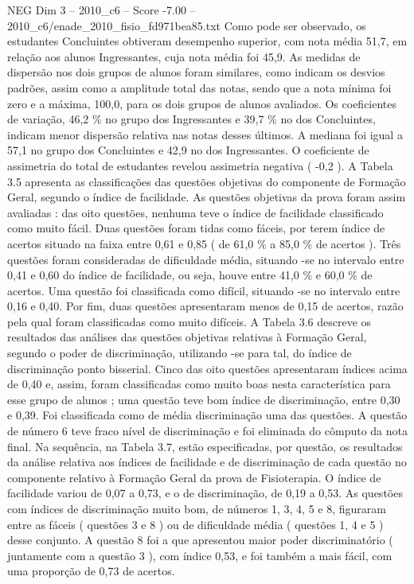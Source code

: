 \begin{textsample}{NEG Dim 3 – 2010\_c6 – Score -7.00 – 2010\_c6/enade\_2010\_fisio\_fd971bea85.txt}
Como pode ser observado, os estudantes Concluintes obtiveram desempenho superior, com nota média 51,7, em relação aos alunos Ingressantes, cuja nota média foi 45,9.
As medidas de dispersão nos dois grupos de alunos foram similares, como indicam os desvios padrões, assim como a amplitude total das notas, sendo que a nota mínima foi zero e a máxima, 100,0, para os dois grupos de alunos avaliados.
Os coeficientes de variação, 46,2 \% no grupo dos Ingressantes e 39,7 \% no dos Concluintes, indicam menor dispersão relativa nas notas desses últimos.
A mediana foi igual a 57,1 no grupo dos Concluintes e 42,9 no dos Ingressantes.
O coeficiente de assimetria do total de estudantes revelou assimetria negativa ( -0,2 ).
A Tabela 3.5 apresenta as classificações das questões objetivas do componente de Formação Geral, segundo o índice de facilidade.
As questões objetivas da prova foram assim avaliadas : das oito questões, nenhuma teve o índice de facilidade classificado como muito fácil.
Duas questões foram tidas como fáceis, por terem índice de acertos situado na faixa entre 0,61 e 0,85 ( de 61,0 \% a 85,0 \% de acertos ).
Três questões foram consideradas de dificuldade média, situando -se no intervalo entre 0,41 e 0,60 do índice de facilidade, ou seja, houve entre 41,0 \% e 60,0 \% de acertos.
Uma questão foi classificada como difícil, situando -se no intervalo entre 0,16 e 0,40.
Por fim, duas questões apresentaram menos de 0,15 de acertos, razão pela qual foram classificadas como muito difíceis.
A Tabela 3.6 descreve os resultados das análises das questões objetivas relativas à Formação Geral, segundo o poder de discriminação, utilizando -se para tal, do índice de discriminação ponto bisserial.
Cinco das oito questões apresentaram índices acima de 0,40 e, assim, foram classificadas como muito boas nesta característica para esse grupo de alunos ; uma questão teve bom índice de discriminação, entre 0,30 e 0,39.
Foi classificada como de média discriminação uma das questões.
A questão de número 6 teve fraco nível de discriminação e foi eliminada do cômputo da nota final.
Na sequência, na Tabela 3.7, estão especificadas, por questão, os resultados da análise relativa aos índices de facilidade e de discriminação de cada questão no componente relativo à Formação Geral da prova de Fisioterapia.
O índice de facilidade variou de 0,07 a 0,73, e o de discriminação, de 0,19 a 0,53.
As questões com índices de discriminação muito bom, de números 1, 3, 4, 5 e 8, figuraram entre as fáceis ( questões 3 e 8 ) ou de dificuldade média ( questões 1, 4 e 5 ) desse conjunto.
A questão 8 foi a que apresentou maior poder discriminatório ( juntamente com a questão 3 ), com índice 0,53, e foi também a mais fácil, com uma proporção de 0,73 de acertos.

\end{textsample}
